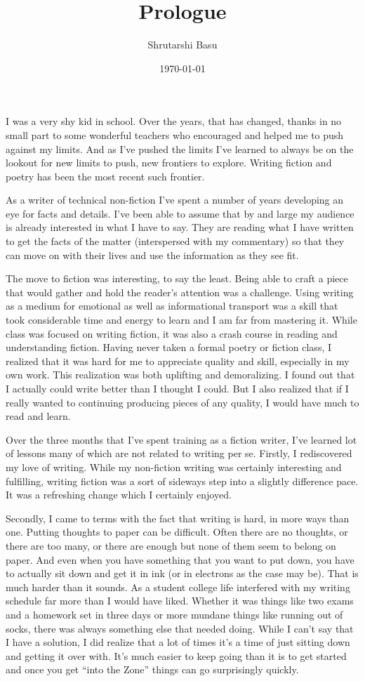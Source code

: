 \documentclass[12pt,letterpaper]{article}
\title{Prologue}
\author{Shrutarshi Basu}
\date{\today}
\begin{document}
\maketitle
\doublespacing


I was a very shy kid in school. Over the years, that has changed, thanks in no small part to some wonderful teachers who encouraged and helped me to push against my limits. And as I've pushed the limits I've learned to always be on the lookout for new limits to push, new frontiers to explore. Writing fiction and poetry has been the most recent such frontier.

As a writer of technical non-fiction I've spent a number of years developing an eye for facts and details. I've been able to assume that by and large my audience is already interested in what I have to say. They are reading what I have written to get the facts of the matter (interspersed with my commentary) so that they can move on with their lives and use the information as they see fit. 

The move to fiction was interesting, to say the least. Being able to craft a piece that would gather and hold the reader's attention was a challenge. Using writing as a medium for emotional as well as informational transport was a skill that took considerable time and energy to learn and I am far from mastering it. While class was focused on writing fiction, it was also a crash course in reading and understanding fiction. Having never taken a formal poetry or fiction class, I realized that it was hard for me to appreciate quality and skill, especially in my own work. This realization was both uplifting and demoralizing. I found out that I actually could write better than I thought I could. But I also realized that if I really wanted to continuing producing pieces of any quality, I would have much to read and learn.

Over the three months that I've spent training as a fiction writer, I've learned lot of lessons many of which are not related to writing per se. Firstly, I rediscovered my love of writing. While my non-fiction writing was certainly interesting and fulfilling, writing fiction was a sort of sideways step into a slightly difference pace. It was a refreshing change which I certainly enjoyed.

Secondly, I came to terms with the fact that writing is hard, in more ways than one. Putting thoughts to paper can be difficult. Often there are no thoughts, or there are too many, or there are enough but none of them seem to belong on paper. And even when you have something that you want to put down, you have to actually sit down and get it in ink (or in electrons as the case may be). That is much harder than it sounds. As a student college life interfered with my writing schedule far more than I would have liked. Whether it was things like two exams and a homework set in three days or more mundane things like running out of socks, there was always something else that needed doing. While I can't say that I have a solution, I did realize that a lot of times it's a time of just sitting down and getting it over with. It's much easier to keep going than it is to get started and once you get ``into the Zone'' things can go surprisingly quickly.
\end{document}

